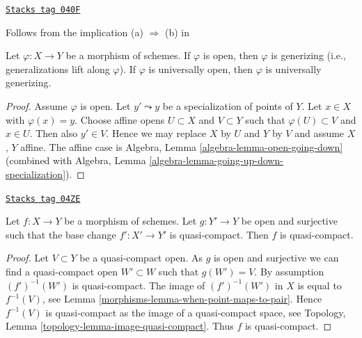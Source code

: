 \begin{lemma}
\label{morphisms-lemma-open-generizing}
\href{https://stacks.math.columbia.edu/tag/040F}{\texttt{Stacks tag 040F}}

\begin{reference}
Follows from the implication (a) $\Rightarrow$ (b) in
\cite[IV, Corollary 1.10.4]{EGA}
\end{reference}
Let $\varphi : X \to Y$ be a morphism of schemes.
If $\varphi$ is open, then $\varphi$ is generizing
(i.e., generalizations lift along $\varphi$).
If $\varphi$ is universally open, then $\varphi$ is
universally generizing.
\end{lemma}

\begin{proof}
Assume $\varphi$ is open.
Let $y' \leadsto y$ be a specialization of points of $Y$.
Let $x \in X$ with $\varphi(x) = y$.
Choose affine opens $U \subset X$ and $V \subset Y$ such that
$\varphi(U) \subset V$ and $x \in U$. Then also $y' \in V$. Hence we
may replace $X$ by $U$ and $Y$ by $V$ and assume $X$, $Y$ affine.
The affine case is
Algebra, Lemma \ref{algebra-lemma-open-going-down}
(combined with
Algebra, Lemma \ref{algebra-lemma-going-up-down-specialization}).
\end{proof}

\begin{lemma}
\label{morphisms-lemma-descent-quasi-compact}
\href{https://stacks.math.columbia.edu/tag/04ZE}{\texttt{Stacks tag 04ZE}}

Let $f : X \to Y$ be a morphism of schemes.
Let $g : Y' \to Y$ be open and surjective such that the base change
$f' : X' \to Y'$ is quasi-compact. Then $f$ is quasi-compact.
\end{lemma}

\begin{proof}

Let $V \subset Y$ be a quasi-compact open. As $g$ is open and surjective
we can find a quasi-compact open $W' \subset W$ such that $g(W') = V$.
By assumption $(f')^{-1}(W')$ is quasi-compact. The image of
$(f')^{-1}(W')$ in $X$ is equal to $f^{-1}(V)$, see
Lemma \ref{morphisms-lemma-when-point-maps-to-pair}.
Hence $f^{-1}(V)$ is quasi-compact as the image of a quasi-compact space, see
Topology, Lemma \ref{topology-lemma-image-quasi-compact}.
Thus $f$ is quasi-compact.
\end{proof}

